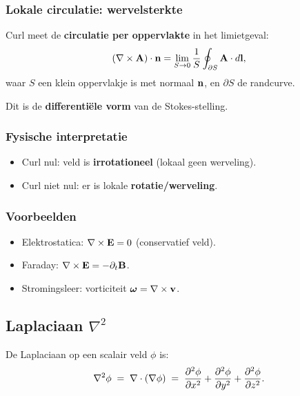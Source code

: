 \documentclass[11pt,a4paper]{article}
\begin{document}
    \subsubsection{Lokale circulatie: wervelsterkte}
    Curl meet de \textbf{circulatie per oppervlakte} in het limietgeval:
    \begin{equation}
        (\nabla\times\vb{A})\cdot \vb{n} = \lim_{S\to 0}\frac{1}{S}\oint_{\partial S}\vb{A}\cdot d\vb{l},
    \end{equation}
    waar \(S\) een klein oppervlakje is met normaal \(\vb{n}\), en \(\partial S\) de randcurve.

    Dit is de \textbf{differenti\"ele vorm} van de Stokes-stelling.

    \subsubsection{Fysische interpretatie}
    \begin{itemize}
        \item Curl nul: veld is \textbf{irrotationeel} (lokaal geen werveling).
        \item Curl niet nul: er is lokale \textbf{rotatie/werveling}.
    \end{itemize}

    \subsubsection{Voorbeelden}
    \begin{itemize}
        \item Elektrostatica: \(\nabla\times\vb{E}=0\) (conservatief veld).
        \item Faraday: \(\nabla\times\vb{E}=-\partial_t \vb{B}\).
        \item Stromingsleer: vorticiteit \(\boldsymbol{\omega}=\nabla\times\vb{v}\).
    \end{itemize}


    \subsection{Laplaciaan \texorpdfstring{$\nabla^2$}{∇²}}
    De Laplaciaan op een scalair veld \(\phi\) is:
    \begin{equation}
        \nabla^2\phi \;=\; \nabla\cdot(\nabla\phi)
        \;=\; \pdv[2]{\phi}{x}+\pdv[2]{\phi}{y}+\pdv[2]{\phi}{z}.
    \end{equation}
\end{document}
